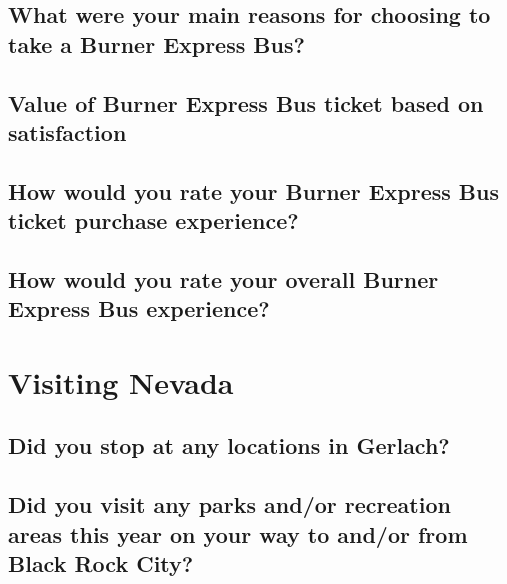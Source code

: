 \documentclass[
]{book}
\begin{document}
\hypertarget{what-were-your-main-reasons-for-choosing-to-take-a-burner-express-bus}{%
\subsection{What were your main reasons for choosing to take a Burner Express Bus?}\label{what-were-your-main-reasons-for-choosing-to-take-a-burner-express-bus}}

\hypertarget{value-of-burner-express-bus-ticket-based-on-satisfaction}{%
\subsection{Value of Burner Express Bus ticket based on satisfaction}\label{value-of-burner-express-bus-ticket-based-on-satisfaction}}

\hypertarget{how-would-you-rate-your-burner-express-bus-ticket-purchase-experience}{%
\subsection{How would you rate your Burner Express Bus ticket purchase experience?}\label{how-would-you-rate-your-burner-express-bus-ticket-purchase-experience}}

\hypertarget{how-would-you-rate-your-overall-burner-express-bus-experience}{%
\subsection{How would you rate your overall Burner Express Bus experience?}\label{how-would-you-rate-your-overall-burner-express-bus-experience}}

\hypertarget{visiting-nevada}{%
\section{Visiting Nevada}\label{visiting-nevada}}

\hypertarget{did-you-stop-at-any-locations-in-gerlach}{%
\subsection{Did you stop at any locations in Gerlach?}\label{did-you-stop-at-any-locations-in-gerlach}}

\hypertarget{did-you-visit-any-parks-andor-recreation-areas-this-year-on-your-way-to-andor-from-black-rock-city}{%
\subsection{Did you visit any parks and/or recreation areas this year on your way to and/or from Black Rock City?}\label{did-you-visit-any-parks-andor-recreation-areas-this-year-on-your-way-to-andor-from-black-rock-city}}
\end{document}
